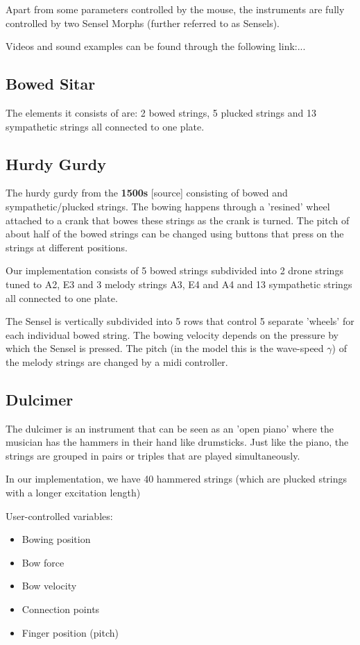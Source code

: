 \documentclass{article}
\begin{document}
Apart from some parameters controlled by the mouse, the instruments are fully controlled by two Sensel Morphs (further referred to as Sensels).   

Videos and sound examples can be found through the following link:...

\subsection{Bowed Sitar}
The elements it consists of are: 2 bowed strings, 5 plucked strings and 13 sympathetic strings all connected to one plate.

\subsection{Hurdy Gurdy}
The hurdy gurdy from the \textbf{1500s} [source] consisting of bowed and sympathetic/plucked strings. The bowing happens through a 'resined' wheel attached to a crank that bowes these strings as the crank is turned. The pitch of about half of the bowed strings can be changed using buttons that press on the strings at different positions.

Our implementation consists of 5 bowed strings subdivided into 2 drone strings tuned to A2, E3 and 3 melody strings A3, E4 and A4 and 13 sympathetic strings all connected to one plate. 

The Sensel is vertically subdivided into 5 rows that control 5 separate 'wheels' for each individual bowed string. The bowing velocity depends on the pressure by which the Sensel is pressed. The pitch (in the model this is the wave-speed $\gamma$) of the melody strings are changed by a midi controller.

\subsection{Dulcimer}
The dulcimer is an instrument that can be seen as an 'open piano' where the musician has the hammers in their hand like drumsticks. Just like the piano, the strings are grouped in pairs or triples %
that are played simultaneously. 

In our implementation, we have 40 hammered strings (which are plucked strings with a longer excitation length)


User-controlled variables:
\begin{itemize}
    \item Bowing position
    \item Bow force
    \item Bow velocity
    \item Connection points
    \item Finger position (pitch)
\end{itemize}
\end{document}
